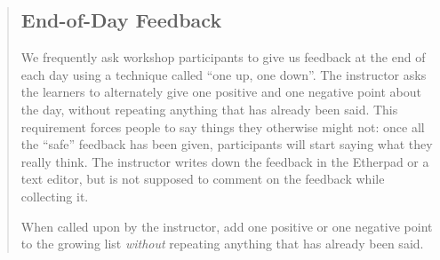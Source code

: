 \begin{quotation}   %
\subsection*{End-of-Day Feedback}

We frequently ask workshop participants to give us feedback at the end
of each day using a technique called ``one up, one down''.  The
instructor asks the learners to alternately give one positive and one
negative point about the day, without repeating anything that has
already been said.  This requirement forces people to say things they
otherwise might not: once all the ``safe'' feedback has been given,
participants will start saying what they really think. The instructor
writes down the feedback in the Etherpad or a text editor,
but is not supposed to comment on the feedback while collecting it.

When called upon by the instructor, add one positive or one negative
point to the growing list \emph{without} repeating anything that has
already been said.
\end{quotation}   %
